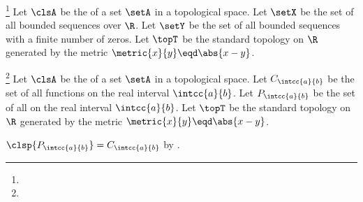 \begin{example}
\footnote{
  }
Let $\clsA$ be the   of a set $\setA$ in a topological space.
Let $\setX$ be the set of all bounded sequences over $\R$.
Let $\setY$ be the set of all bounded sequences with a finite number of zeros.
Let $\topT$ be the standard topology on $\R$ generated by the metric $\metric{x}{y}\eqd\abs{x-y}$.
\end{example}

\begin{example}
\footnote{
  }
Let $\clsA$ be the  of a set $\setA$ in a topological space.
Let $C_{\intcc{a}{b}}$ be the set of all    functions on the real interval $\intcc{a}{b}$.
Let $P_{\intcc{a}{b}}$ be the set of all  on the real interval $\intcc{a}{b}$.
Let $\topT$ be the standard topology on $\R$ generated by the metric $\metric{x}{y}\eqd\abs{x-y}$.
\end{example}
\begin{proofns}
  $\clsp{P_{\intcc{a}{b}}}=C_{\intcc{a}{b}}$ by .
\end{proofns}


